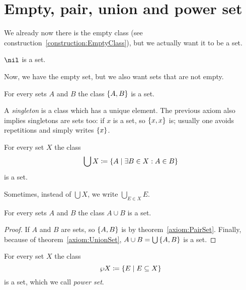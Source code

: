 
\section{Empty, pair, union and power set}

We already now there is the empty class (see construction~\ref{construction:EmptyClass}), but we actually want it to be a set.

\begin{axiom}
\(\nil\) is a set.
\end{axiom}

Now, we have the empty set, but we also want sets that are not empty.

\begin{axiom}\label{axiom:PairSet}
For every sets \(A\) and \(B\) the class \(\left\{A, B\right\}\) is a set.
\end{axiom}

A {\em singleton} is a class which has a unique element. The previous axiom also implies singletons are sets too:  if \(x\) is a set, so \(\left\{x, x\right\}\) is; usually one avoids repetitions and simply writes \(\left\{x\right\}\).


\begin{axiom}\label{axiom:UnionSet}
For every set \(X\) the class %
\[\bigcup X \coloneq \left\{A \mid \exists B \in X : A \in B\right\}\]
is a set.
\end{axiom}

Sometimes, instead of \(\bigcup X\), we write \(\bigcup_{E \in X} E\).

\begin{theorem}
For every sets \(A\) and \(B\) the class \(A \cup B\) is a set.
\end{theorem}

\begin{proof}
If \(A\) and \(B\) are sets, so \(\left\{A, B\right\}\) is by theorem~\ref{axiom:PairSet}. Finally, because of theorem~\ref{axiom:UnionSet}, \(A \cup B = \bigcup \left\{A, B\right\}\) is a set.
\end{proof}

\begin{axiom}\label{axiom:PowerSet}
For every set \(X\) the class
\[\wp X \coloneq \left\{E \mid E \subseteq X\right\}\]
is a set, which we call {\em power set}.
\end{axiom}